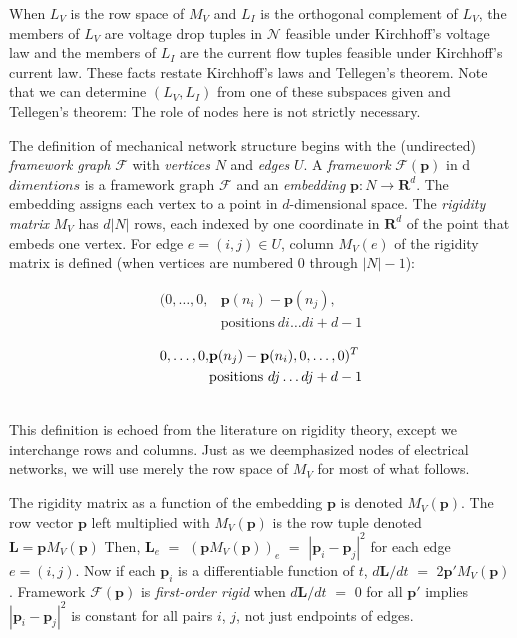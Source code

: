 \documentclass{article}
\def\Reals{\ensuremath{\mathbf R}}
\newcommand{\extra}[1]{{\small{#1}}}
\begin{document}
When $L_V$ is the row space of $M_V$ and $L_I$ is the orthogonal complement
of $L_V$, the members of $L_V$ are voltage drop tuples in $\mathcal{N}$ 
feasible under Kirchhoff's voltage law and the members of $L_I$ are the 
current flow tuples feasible under Kirchhoff's current law.  These facts 
restate Kirchhoff's laws and Tellegen's theorem.  Note that we can determine
$(L_V, L_I)$ from one of these subspaces given and Tellegen's theorem: The
role of nodes here is not strictly necessary.

The definition of mechanical network structure begins with the 
(undirected) \textit{framework graph} $\mathcal{F}$ with \textit{vertices}
$N$ and \textit{edges} $U$.  A \textit{framework} $\mathcal{F}(\mathbf{p})$ 
in d $dimentions$ is a framework graph $\mathcal{F}$ and an \textit{embedding} 
$\mathbf{p}:N\rightarrow \Reals^d$.  
The embedding assigns each vertex to a point in
$d$-dimensional space.  The \textit{rigidity matrix} $M_V$ 
has $d|N|$ rows, each
indexed by one coordinate in $\Reals^d$ of the point that embeds one vertex.
For edge $e=(i,j)\in U$, column $M_V(e)$ of the rigidity matrix is defined 
(when vertices are numbered 0 through $|N|-1$):\\
\begin{minipage}{\linewidth}
\begin{align*}
(0, \ldots,0, &\mathbf{p}(n_i)-\mathbf{p}(n_j),\\
              &\mathrm{positions\ } di\ldots di+d-1
\end{align*}
\end{minipage}
\hfill\begin{minipage}{.85\linewidth}
\begin{align*}
\hfill 0,\ldots,0,&\mathbf{p}(n_j)-\mathbf{p}(n_i), 0, \ldots,0)^T\\
                  &\mathrm{positions\ } dj\ldots dj+d-1
\end{align*}
      \end{minipage}\\
This definition is echoed from the literature \cite{RigidityBook} on rigidity theory, except
we interchange rows and columns.  Just as we deemphasized nodes of electrical
networks, we will use merely the row space of $M_V$ for most of what follows.

\extra{
The rigidity matrix as a function of the embedding $\mathbf{p}$ is denoted
$M_V(\mathbf{p})$.  The row vector $\mathbf{p}$ left multiplied with
$M_V(\mathbf{p})$
is the row tuple denoted $\mathbf{L}=\mathbf{p}M_V(\mathbf{p})$  Then, 
$\mathbf{L}_e$ $=$ 
$(\mathbf{p}M_V(\mathbf{p}))_e$ $=$ $|\mathbf{p}_i-\mathbf{p}_j|^2$ for
each edge $e=(i,j)$.  Now if each $\mathbf{p}_i$ is a differentiable function
of $t$, $d\mathbf{L}/dt$ $=$ $2\mathbf{p}'M_V(\mathbf{p})$.  Framework
$\mathcal{F}(\mathbf{p})$ is \textit{first-order rigid} when 
$d\mathbf{L}/dt$ $=$ $0$ for all $\mathbf{p}'$ implies 
$|\mathbf{p}_i-\mathbf{p}_j|^2$ is constant for all pairs $i$, $j$, not just
endpoints of edges. 
}%
\end{document}
